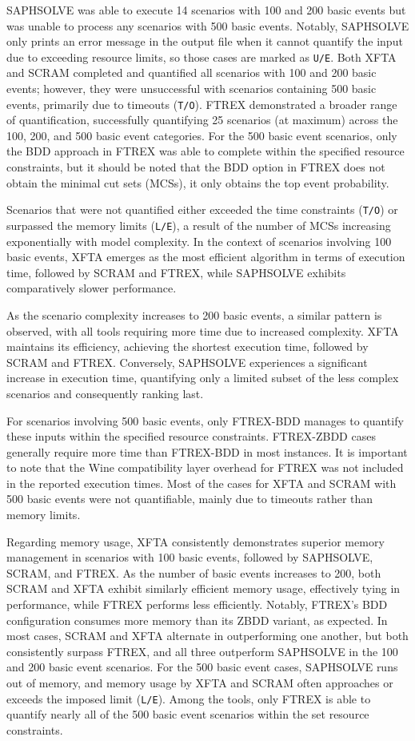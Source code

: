 SAPHSOLVE was able to execute 14 scenarios with 100 and 200 basic events but was unable to process any scenarios with 500 basic events. Notably, SAPHSOLVE only prints an error message in the output file when it cannot quantify the input due to exceeding resource limits, so those cases are marked as \texttt{U/E}. Both XFTA and SCRAM completed and quantified all scenarios with 100 and 200 basic events; however, they were unsuccessful with scenarios containing 500 basic events, primarily due to timeouts (\texttt{T/O}). FTREX demonstrated a broader range of quantification, successfully quantifying 25 scenarios (at maximum) across the 100, 200, and 500 basic event categories. For the 500 basic event scenarios, only the BDD approach in FTREX was able to complete within the specified resource constraints, but it should be noted that the BDD option in FTREX does not obtain the minimal cut sets (MCSs), it only obtains the top event probability.

Scenarios that were not quantified either exceeded the time constraints (\texttt{T/O}) or surpassed the memory limits (\texttt{L/E}), a result of the number of MCSs increasing exponentially with model complexity. In the context of scenarios involving 100 basic events, XFTA emerges as the most efficient algorithm in terms of execution time, followed by SCRAM and FTREX, while SAPHSOLVE exhibits comparatively slower performance.

As the scenario complexity increases to 200 basic events, a similar pattern is observed, with all tools requiring more time due to increased complexity. XFTA maintains its efficiency, achieving the shortest execution time, followed by SCRAM and FTREX. Conversely, SAPHSOLVE experiences a significant increase in execution time, quantifying only a limited subset of the less complex scenarios and consequently ranking last.

For scenarios involving 500 basic events, only FTREX-BDD manages to quantify these inputs within the specified resource constraints. FTREX-ZBDD cases generally require more time than FTREX-BDD in most instances. It is important to note that the Wine compatibility layer overhead for FTREX was not included in the reported execution times. Most of the cases for XFTA and SCRAM with 500 basic events were not quantifiable, mainly due to timeouts rather than memory limits.

Regarding memory usage, XFTA consistently demonstrates superior memory management in scenarios with 100 basic events, followed by SAPHSOLVE, SCRAM, and FTREX. As the number of basic events increases to 200, both SCRAM and XFTA exhibit similarly efficient memory usage, effectively tying in performance, while FTREX performs less efficiently. Notably, FTREX’s BDD configuration consumes more memory than its ZBDD variant, as expected. In most cases, SCRAM and XFTA alternate in outperforming one another, but both consistently surpass FTREX, and all three outperform SAPHSOLVE in the 100 and 200 basic event scenarios. For the 500 basic event cases, SAPHSOLVE runs out of memory, and memory usage by XFTA and SCRAM often approaches or exceeds the imposed limit (\texttt{L/E}). Among the tools, only FTREX is able to quantify nearly all of the 500 basic event scenarios within the set resource constraints.

